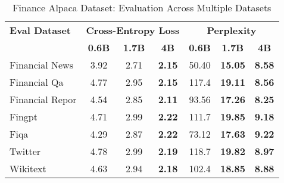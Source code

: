 
\begin{table}[h]
\centering
\caption[Finance Alpaca: Evaluation Results]{Finance Alpaca Dataset: Evaluation Across Multiple Datasets}
\label{tab:alpaca_results}
\begin{tabular}{l|ccc|ccc}
\hline
\textbf{Eval Dataset} & \multicolumn{3}{c|}{\textbf{Cross-Entropy Loss}} & \multicolumn{3}{c}{\textbf{Perplexity}} \\
\cline{2-4} \cline{5-7}
  & \textbf{0.6B} & \textbf{1.7B} & \textbf{4B} & \textbf{0.6B} & \textbf{1.7B} & \textbf{4B} \\
Financial News & 3.92 & 2.71 & \textbf{2.15} & 50.40 & \textbf{15.05} & \textbf{8.58} \\
Financial Qa & 4.77 & 2.95 & \textbf{2.15} & 117.4 & \textbf{19.11} & \textbf{8.56} \\
Financial Repor & 4.54 & 2.85 & \textbf{2.11} & 93.56 & \textbf{17.26} & \textbf{8.25} \\
Fingpt & 4.71 & 2.99 & \textbf{2.22} & 111.7 & \textbf{19.85} & \textbf{9.18} \\
Fiqa & 4.29 & 2.87 & \textbf{2.22} & 73.12 & \textbf{17.63} & \textbf{9.22} \\
Twitter & 4.78 & 2.99 & \textbf{2.19} & 118.7 & \textbf{19.82} & \textbf{8.97} \\
Wikitext & 4.63 & 2.94 & \textbf{2.18} & 102.4 & \textbf{18.85} & \textbf{8.88} \\
\hline
\end{tabular}
\end{table}

